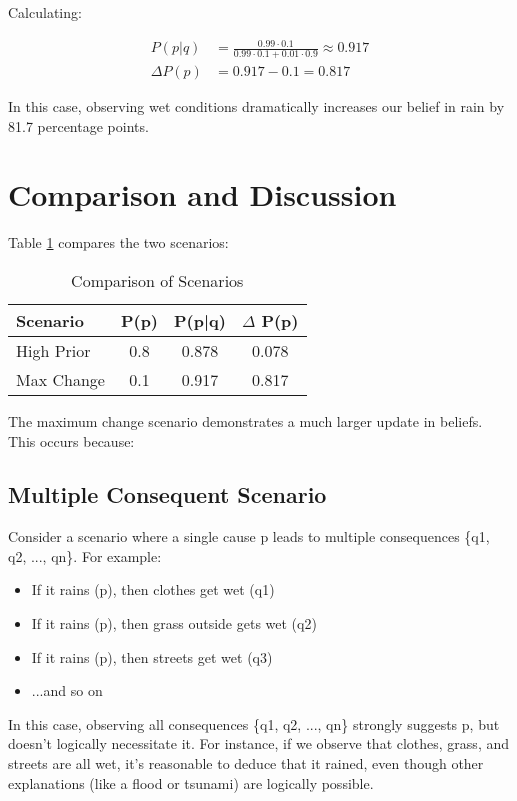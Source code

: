 \documentclass[10pt,a4paper]{article}
\begin{document}
Calculating:

\begin{align*}
    P(p|q) &= \frac{0.99 \cdot 0.1}{0.99 \cdot 0.1 + 0.01 \cdot 0.9} \approx 0.917 \\
    \Delta P(p) &= 0.917 - 0.1 = 0.817
\end{align*}

In this case, observing wet conditions dramatically increases our belief in rain by 81.7 percentage points.

\section{Comparison and Discussion}
Table \ref{tab:comparison} compares the two scenarios:

\begin{table}[h]
\centering
\caption{Comparison of Scenarios}
\label{tab:comparison}
\begin{tabular}{@{}lccc@{}}
\toprule
Scenario & P(p) & P(p|q) & $\Delta$ P(p) \\
\midrule
High Prior & 0.8 & 0.878 & 0.078 \\
Max Change & 0.1 & 0.917 & 0.817 \\
\bottomrule
\end{tabular}
\end{table}

The maximum change scenario demonstrates a much larger update in beliefs. This occurs because:

\subsection{Multiple Consequent Scenario}
Consider a scenario where a single cause p leads to multiple consequences \{q1, q2, ..., qn\}. For example:

\begin{itemize}
    \item If it rains (p), then clothes get wet (q1)
    \item If it rains (p), then grass outside gets wet (q2)
    \item If it rains (p), then streets get wet (q3)
    \item ...and so on
\end{itemize}

In this case, observing all consequences \{q1, q2, ..., qn\} strongly suggests p, but doesn't logically necessitate it. For instance, if we observe that clothes, grass, and streets are all wet, it's reasonable to deduce that it rained, even though other explanations (like a flood or tsunami) are logically possible.
\end{document}
